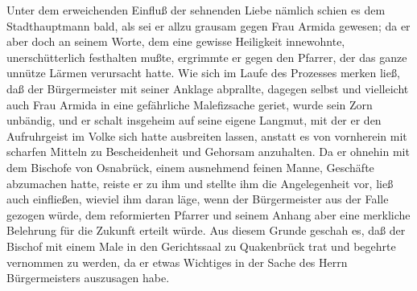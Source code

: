 Unter dem erweichenden Einfluß der sehnenden Liebe nämlich schien
es dem Stadthauptmann bald, als sei er allzu grausam gegen Frau
Armida gewesen; da er aber doch an seinem Worte, dem eine gewisse
Heiligkeit innewohnte, unerschütterlich festhalten mußte, ergrimmte
er gegen den Pfarrer, der das ganze unnütze Lärmen verursacht
hatte. Wie sich im Laufe des Prozesses merken ließ, daß der
Bürgermeister mit seiner Anklage abprallte, dagegen selbst und
vielleicht auch Frau Armida in eine gefährliche Malefizsache
geriet, wurde sein Zorn unbändig, und er schalt insgeheim auf seine
eigene Langmut, mit der er den Aufruhrgeist im Volke sich hatte
ausbreiten lassen, anstatt es von vornherein mit scharfen Mitteln
zu Bescheidenheit und Gehorsam anzuhalten. Da er ohnehin mit dem
Bischofe von Osnabrück, einem ausnehmend feinen Manne, Geschäfte
abzumachen hatte, reiste er zu ihm und stellte ihm die
Angelegenheit vor, ließ auch einfließen, wieviel ihm daran läge,
wenn der Bürgermeister aus der Falle gezogen würde, dem
reformierten Pfarrer und seinem Anhang aber eine\pagenum{[38]}
merkliche Belehrung für die Zukunft erteilt würde. Aus diesem
Grunde geschah es, daß der Bischof mit einem Male in den
Gerichtssaal zu Quakenbrück trat und begehrte vernommen zu werden,
da er etwas Wichtiges in der Sache des Herrn Bürgermeisters
auszusagen habe.

